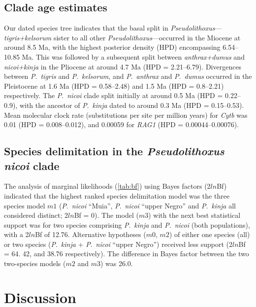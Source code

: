 \documentclass[12pt]{article}
\begin{document}
\subsection*{Clade age estimates}

Our dated species tree indicates that the basal split in \emph{Pseudolithoxus}---\emph{tigris+kelsorum} sister to all other \emph{Pseudolithoxus}---occurred in the Miocene at around 8.5 Ma, with the highest posterior density (HPD) encompassing 6.54--10.85 Ma. %
This was followed by a subsequent split between \emph{anthrax+dumus} and \emph{nicoi+kinja} in the Pliocene at around 4.7 Ma (HPD = 2.21--6.79). %
Divergences between \emph{P}.\ \emph{tigris} and \emph{P}.\ \emph{kelsorum}, and \emph{P}.\ \emph{anthrax} and \emph{P}.\ \emph{dumus} occurred in the Pleistocene at 1.6 Ma (HPD = 0.58--2.48) and 1.5 Ma (HPD = 0.8--2.21) respectively. %
The \emph{P}.\ \emph{nicoi} clade split initially at around 0.5 Ma (HPD = 0.22–0.9), with the ancestor of \emph{P}.\ \emph{kinja} dated to around 0.3 Ma (HPD = 0.15–0.53). %
Mean molecular clock rate (substitutions per site per million years) for \emph{Cytb} was 0.01 (HPD = 0.008--0.012), and 0.00059 for \emph{RAG1} (HPD = 0.00044--0.00076).

\subsection*{Species delimitation in the \emph{Pseudolithoxus nicoi} clade}

The analysis of marginal likelihoods (\autoref{tab:bf}) using Bayes factors (2$ln$Bf) indicated that the highest ranked species delimitation model was the three species model $m1$ (\emph{P}.\ \emph{nicoi} ``Muia'', \emph{P}.\ \emph{nicoi} ``upper Negro'' and \emph{P}.\ \emph{kinja} all considered distinct; 2$ln$Bf = 0). %
The model ($m3$) with the next best statistical support was for two species comprising \emph{P}.\ \emph{kinja} and \emph{P}.\ \emph{nicoi} (both populations), with a 2$ln$Bf of 12.76. %
Alternative hypotheses ($m0$, $m2$) of either one species (all) or two species (\emph{P}.\ \emph{kinja} + \emph{P}.\ \emph{nicoi} ``upper Negro'') received less support (2$ln$Bf = 64. 42, and 38.76 respectively). %
The difference in Bayes factor between the two two-species models ($m2$ and $m3$) was 26.0.%

\section*{Discussion}
\end{document}
